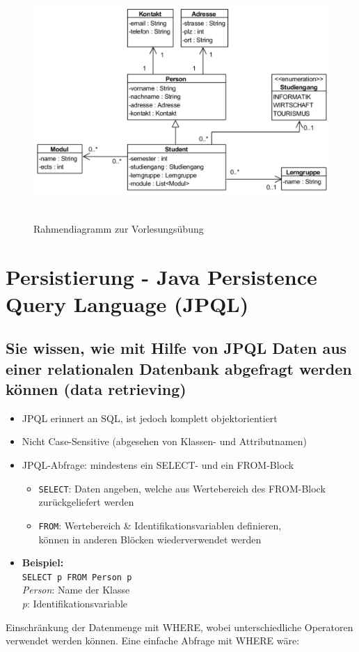 \documentclass[a4paper]{article}
\begin{document}
		\begin{figure}[!htb]
			\centering
			\includegraphics[keepaspectratio, height=9cm]{img/persistence/jpa_exercise.png}
			\caption{Rahmendiagramm zur Vorlesungsübung}
			\label{fig:jpa_exercise}
		\end{figure}
		
				
	\newpage
	\section{Persistierung - Java Persistence Query Language (JPQL)}
		
		\subsection{Sie wissen, wie mit Hilfe von JPQL Daten aus einer relationalen Datenbank abgefragt werden können (data retrieving)}
		
		\begin{itemize}
			\item JPQL erinnert an SQL, ist jedoch komplett objektorientiert
			\item Nicht Case-Sensitive (abgesehen von Klassen- und Attributnamen)
			\item JPQL-Abfrage: mindestens ein SELECT- und ein FROM-Block
				\begin{itemize}
					\item \texttt{SELECT}: Daten angeben, welche aus Wertebereich des FROM-Block zurückgeliefert werden
					\item \texttt{FROM}: Wertebereich \& Identifikationsvariablen definieren,\\
						können in anderen Blöcken wiederverwendet werden
				\end{itemize}
			\item \textbf{Beispiel:}\\
			\texttt{SELECT p FROM Person p}\\
			\textit{Person}: Name der Klasse\\
			\textit{p}: Identifikationsvariable\\
		\end{itemize}
		\noindent
		Einschränkung der Datenmenge mit WHERE, wobei unterschiedliche Operatoren verwendet werden können. Eine einfache Abfrage mit WHERE wäre:
		
\end{document}
